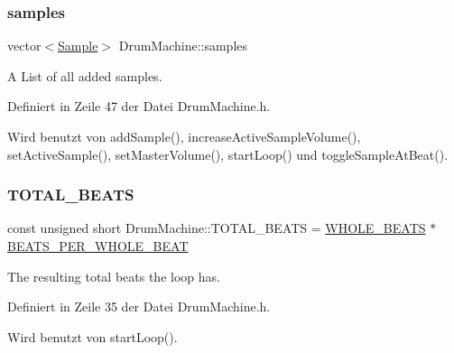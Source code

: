 \mbox{\label{class_drum_machine_acf215ead70c41e760556497281aa562e}} 
\subsubsection{\texorpdfstring{samples}{samples}}
{\footnotesize\ttfamily vector$<$\hyperlink{class_sample}{Sample}$>$ Drum\+Machine\+::samples\hspace{0.3cm}{\ttfamily [private]}}



A List of all added samples. 



Definiert in Zeile 47 der Datei Drum\+Machine.\+h.



Wird benutzt von add\+Sample(), increase\+Active\+Sample\+Volume(), set\+Active\+Sample(), set\+Master\+Volume(), start\+Loop() und toggle\+Sample\+At\+Beat().

\mbox{\label{class_drum_machine_a25ff7c6556614ab787a626a5c6ec1683}} 
\subsubsection{\texorpdfstring{T\+O\+T\+A\+L\+\_\+\+B\+E\+A\+TS}{TOTAL\_BEATS}}
{\footnotesize\ttfamily const unsigned short Drum\+Machine\+::\+T\+O\+T\+A\+L\+\_\+\+B\+E\+A\+TS = \hyperlink{class_drum_machine_a54e06658e13970dc7679051e8194f546}{W\+H\+O\+L\+E\+\_\+\+B\+E\+A\+TS} $\ast$ \hyperlink{class_drum_machine_ab4d2056f29b6eb959aa379afcc6b70f0}{B\+E\+A\+T\+S\+\_\+\+P\+E\+R\+\_\+\+W\+H\+O\+L\+E\+\_\+\+B\+E\+AT}\hspace{0.3cm}{\ttfamily [private]}}



The resulting total beats the loop has. 



Definiert in Zeile 35 der Datei Drum\+Machine.\+h.



Wird benutzt von start\+Loop().

\mbox{\label{class_drum_machine_af1401c2a8e1d016ec32c662968e581fd}} 
